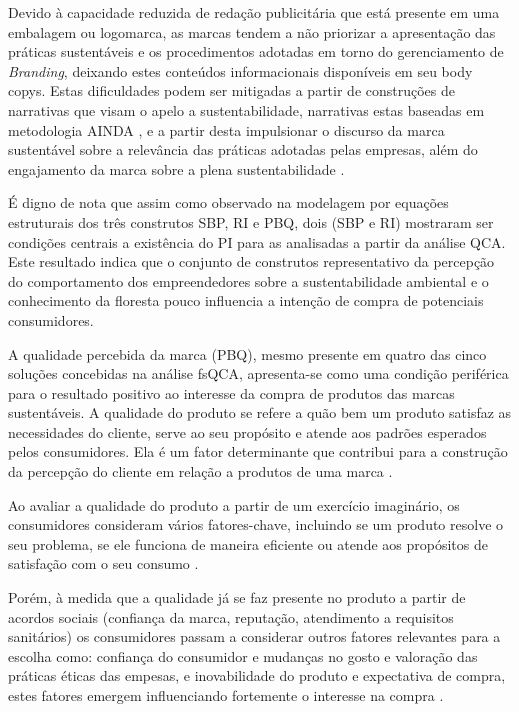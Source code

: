 Devido à capacidade reduzida de redação publicitária que está presente em uma embalagem ou logomarca, as marcas tendem a não priorizar a apresentação das práticas sustentáveis e os procedimentos adotadas em torno do gerenciamento de \textit{Branding}, deixando estes conteúdos informacionais disponíveis em seu body copys. Estas dificuldades podem ser mitigadas a partir de construções de narrativas que visam o apelo a sustentabilidade, narrativas estas baseadas em metodologia AINDA \cite{Radu2021EuropeanAccessing}, e a partir desta impulsionar o discurso da marca sustentável sobre a relevância das práticas adotadas pelas empresas, além do engajamento da marca sobre a plena sustentabilidade \cite{Kasuma2022SustainabilityAsia}.  

É digno de nota que assim como observado na modelagem por equações estruturais dos três construtos SBP, RI e PBQ, dois (SBP e RI) mostraram ser condições centrais a existência do PI para as analisadas a partir da análise QCA. Este resultado indica que o conjunto de construtos representativo da percepção do comportamento dos empreendedores sobre a sustentabilidade ambiental e o conhecimento da floresta pouco influencia a intenção de compra de potenciais consumidores.

A qualidade percebida da marca (PBQ), mesmo presente em quatro das cinco soluções concebidas na análise fsQCA, apresenta-se como uma condição periférica para o resultado positivo ao interesse da compra de produtos das marcas sustentáveis. A qualidade do produto se refere a quão bem um produto satisfaz as necessidades do cliente, serve ao seu propósito e atende aos padrões esperados pelos consumidores. Ela é um fator determinante que contribui para a construção da percepção do cliente em relação a produtos de uma marca \cite{Dangi2021CustomerDiscounts}.

Ao avaliar a qualidade do produto a partir de um exercício imaginário, os consumidores consideram vários fatores-chave, incluindo se um produto resolve o seu problema, se ele funciona de maneira eficiente ou atende aos propósitos de satisfação com o seu consumo \cite{Rodrigues2021FactorsConsumers}.

Porém, à medida que a qualidade já se faz presente no produto a partir de acordos sociais (confiança da marca, reputação, atendimento a requisitos sanitários) os consumidores passam a considerar outros fatores relevantes para a escolha como: confiança do consumidor e mudanças no gosto e valoração das práticas éticas das empesas, e inovabilidade do produto e expectativa de compra, estes fatores emergem influenciando fortemente o interesse na compra \cite{Sasmita2015YoungEquity,Nam2011BrandSatisfaction,Mustafa2022EclaircissementAnalysis}.


